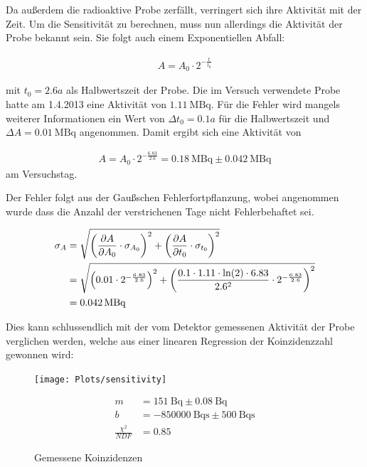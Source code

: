 \documentclass[12pt,twoside,a4paper]{scrartcl}
\begin{document}
			Da außerdem die radioaktive Probe zerfällt, verringert sich ihre Aktivität mit der Zeit. Um die Sensitivität zu berechnen, muss nun allerdings die Aktivität der Probe bekannt sein. Sie folgt auch einem Exponentiellen Abfall:

			\begin{align*}
				A = A_0 \cdot 2^{- \frac{t}{t_0}}
			\end{align*}

			mit $t_0 = 2.6 a$ als Halbwertszeit der Probe. Die im Versuch verwendete Probe hatte am 1.4.2013 eine Aktivität von $\SI{1.11}{\mega \becquerel}$.
			Für die Fehler wird mangels weiterer Informationen ein Wert von $\Delta t_0 = 0.1 a$ für die Halbwertszeit und $\Delta A = \SI{0.01}{\mega \becquerel}$ angenommen.
			Damit ergibt sich eine Aktivität von

			\begin{align*}
				A = A_0 \cdot 2^{- \frac{6.83}{2.6}} = \SI{0.18}{\mega \becquerel} \pm \SI{0.042}{\mega \becquerel}
			\end{align*}
			am Versuchstag.

			Der Fehler folgt aus der Gaußschen Fehlerfortpflanzung, wobei angenommen wurde dass die Anzahl der verstrichenen Tage nicht Fehlerbehaftet sei.

			\begin{align*}
				\sigma_A &= \sqrt{\qty(\pdv{A}{A_0} \cdot \sigma_{A_0})^2 + \qty(\pdv{A}{t_0} \cdot \sigma_{t_0})^2} \\
								 &= \sqrt{\qty(0.01 \cdot 2^{-\frac{6.83}{2.6}})^2 + \qty(\frac{0.1 \cdot 1.11 \cdot \ln(2) \cdot 6.83}{2.6^2} \cdot 2^{-\frac{6.83}{2.6}})^2} \\
								 &= \SI{0.042}{\mega \becquerel}
			\end{align*}

			Dies kann schlussendlich mit der vom Detektor gemessenen Aktivität der Probe verglichen werden, welche aus einer linearen Regression der Koinzidenzzahl gewonnen wird:

			\begin{figure}[H]
				\begin{minipage}{0.6 \textwidth}
					\texttt{[image: Plots/sensitivity]}
					\caption{Gemessene Koinzidenzen}
				\end{minipage}
				\begin{minipage}{0.2 \textwidth}
					\centering
					\begin{align*}
						m &= \SI{151}{\becquerel} \pm \SI{0.08}{\becquerel} \\
						b &= \SI{-850000}{\becquerel \second} \pm \SI{500}{\becquerel \second}\\
						\frac{\chi^2}{NDF} &= 0.85
					\end{align*}
				\end{minipage}
			\end{figure}
\end{document}
